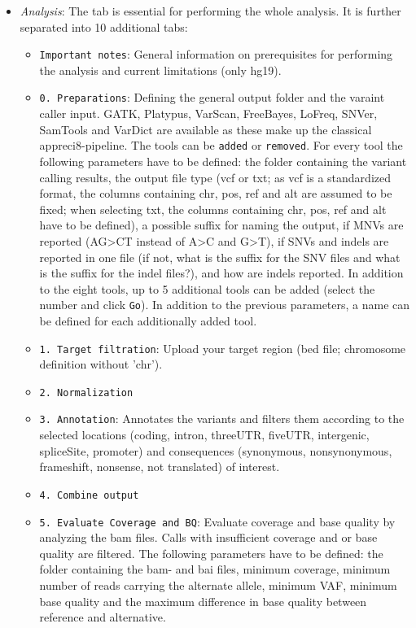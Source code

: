 \documentclass{article}
\begin{document}
\begin{itemize}
\item \emph{Analysis}: The tab is essential for performing the whole analysis. It is further separated into 10 additional tabs:
\begin{itemize}
\item \texttt{Important notes}: General information on prerequisites for performing the analysis and current limitations (only hg19).
\item \texttt{0. Preparations}: Defining the general output folder and the varaint caller input. GATK, Platypus, VarScan, FreeBayes, LoFreq, SNVer, SamTools and VarDict are available as these make up the classical appreci8-pipeline. The tools can be \texttt{added} or \texttt{removed}. For every tool the following parameters have to be defined: the folder containing the variant calling results, the output file type (vcf or txt; as vcf is a standardized format, the columns containing chr, pos, ref and alt are assumed to be fixed; when selecting txt, the columns containing chr, pos, ref and alt have to be defined), a possible suffix for naming the output, if MNVs are reported (AG>CT instead of A>C and G>T), if SNVs and indels are reported in one file (if not, what is the suffix for the SNV files and what is the suffix for the indel files?), and how are indels reported. In addition to the eight tools, up to 5 additional tools can be added (select the number and click \texttt{Go}). In addition to the previous parameters, a name can be defined for each additionally added tool.
\item \texttt{1. Target filtration}: Upload your target region (bed file; chromosome definition without 'chr').
\item \texttt{2. Normalization}
\item \texttt{3. Annotation}: Annotates the variants and filters them according to the selected locations (coding, intron, threeUTR, fiveUTR, intergenic, spliceSite, promoter) and consequences (synonymous, nonsynonymous, frameshift, nonsense, not translated) of interest.
\item \texttt{4. Combine output}
\item \texttt{5. Evaluate Coverage and BQ}: Evaluate coverage and base quality by analyzing the bam files. Calls with insufficient coverage and or base quality are filtered. The following parameters have to be defined: the folder containing the bam- and bai files, minimum coverage, minimum number of reads carrying the alternate allele, minimum VAF, minimum base quality and the maximum difference in base quality between reference and alternative.

\end{itemize}
\end{itemize}
\end{document}
